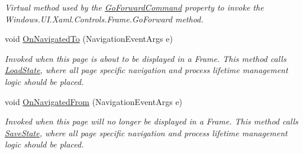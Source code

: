 \begin{DoxyCompactItemize}
\begin{DoxyCompactList}\small\item\em Virtual method used by the \hyperlink{class__1aarsproeve_1_1_common_1_1_navigation_helper_a9bb68ebbefcf2daaeaf8f18775eb8a80}{Go\+Forward\+Command} property to invoke the Windows.\+U\+I.\+Xaml.\+Controls.\+Frame.\+Go\+Forward method. \end{DoxyCompactList}\item 
void \hyperlink{class__1aarsproeve_1_1_common_1_1_navigation_helper_a592295e4be4ec349fd13c6d4700e32e2}{On\+Navigated\+To} (Navigation\+Event\+Args e)
\begin{DoxyCompactList}\small\item\em Invoked when this page is about to be displayed in a Frame. This method calls \hyperlink{class__1aarsproeve_1_1_common_1_1_navigation_helper_ab4abff9d3eb04794d05d43ff3846e344}{Load\+State}, where all page specific navigation and process lifetime management logic should be placed. \end{DoxyCompactList}\item 
void \hyperlink{class__1aarsproeve_1_1_common_1_1_navigation_helper_a0919c4c25dadbd1e73ec38691a6997fe}{On\+Navigated\+From} (Navigation\+Event\+Args e)
\begin{DoxyCompactList}\small\item\em Invoked when this page will no longer be displayed in a Frame. This method calls \hyperlink{class__1aarsproeve_1_1_common_1_1_navigation_helper_a627a89278c28e536b6e7fea11da6d465}{Save\+State}, where all page specific navigation and process lifetime management logic should be placed. \end{DoxyCompactList}\end{DoxyCompactItemize}
